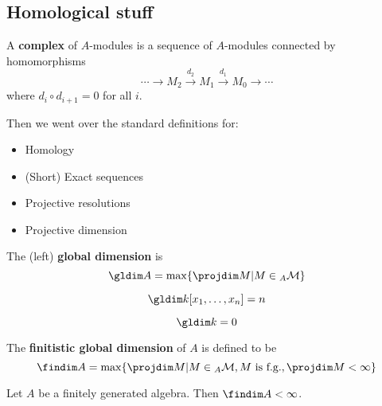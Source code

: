 \documentclass[12pt]{article}
\begin{document}
\subsection{Homological stuff}
\begin{defn}[Complex]
	A \textbf{complex} of $A$-modules is a sequence of $A$-modules connected by homomorphisms
	\[\cdots\to M_2\xrightarrow{d_2}M_1\xrightarrow{d_1} M_0\to \cdots\]
	where $d_i\circ d_{i+1}=0$ for all $i$.
\end{defn}
Then we went over the standard definitions for:
\begin{itemize}
	\item Homology
	\item (Short) Exact sequences
	\item Projective resolutions
	\item Projective dimension
\end{itemize}
\begin{defn}
	The (left) \textbf{global dimension} is
	\[\gldim A=\max\{\projdim M| M\in {_A\mathcal{M}}\}\]
\end{defn}
\begin{thm}
	\[\gldim k[x_1,\dots,x_n]=n\]
\end{thm}
\begin{cor}
	\[\gldim k= 0\]
\end{cor}
\begin{defn}
	The \textbf{finitistic global dimension} of $A$ is defined to be
	\[\findim A=\max\{\projdim M| M\in{_A\mathcal{M}}, M\text{ is f.g.},\projdim M <\infty\}\]
\end{defn}
\begin{conj}
	Let $A$ be a finitely generated algebra. Then $\findim A<\infty$.
\end{conj}
\end{document}

